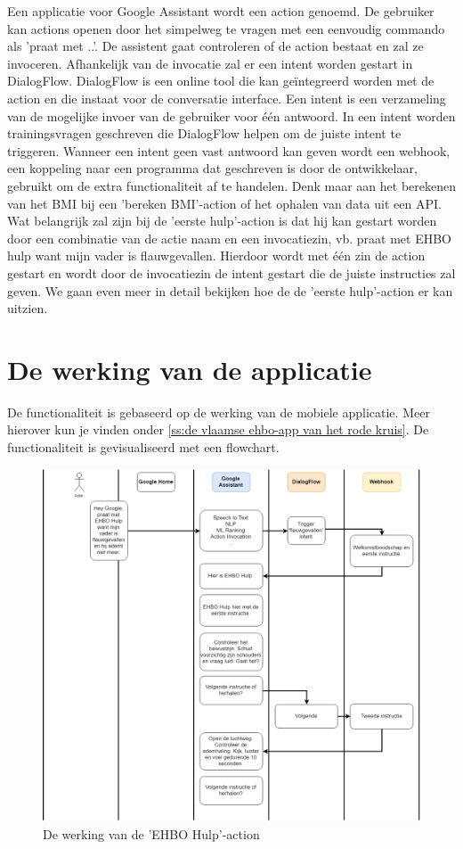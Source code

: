 Een applicatie voor Google Assistant wordt een action genoemd. De gebruiker kan actions openen door het simpelweg te vragen met een eenvoudig commando als 'praat met ..'. De assistent gaat controleren of de action bestaat en zal ze invoceren. Afhankelijk van de invocatie zal er een intent worden gestart in DialogFlow. DialogFlow is een online tool die kan geïntegreerd worden met de action en die instaat voor de conversatie interface. Een intent is een verzameling van de mogelijke invoer van de gebruiker voor één antwoord. In een intent worden trainingsvragen geschreven die DialogFlow helpen om de juiste intent te triggeren. Wanneer een intent geen vast antwoord kan geven wordt een webhook, een koppeling naar een programma dat geschreven is door de ontwikkelaar, gebruikt om de extra functionaliteit af te handelen. Denk maar aan het berekenen van het BMI bij een 'bereken BMI'-action of het ophalen van data uit een API.
Wat belangrijk zal zijn bij de 'eerste hulp'-action is dat hij kan gestart worden door een combinatie van de actie naam en een invocatiezin, vb. praat met EHBO hulp want mijn vader is flauwgevallen. Hierdoor wordt met één zin de action gestart en wordt door de invocatiezin de intent gestart die de juiste instructies zal geven. We gaan even meer in detail bekijken hoe de de 'eerste hulp'-action er kan uitzien.

\section{De werking van de applicatie}
De functionaliteit is gebaseerd op de werking van de mobiele applicatie. Meer hierover kun je vinden onder \ref{ss:de vlaamse ehbo-app van het rode kruis}. De functionaliteit is gevisualiseerd met een flowchart.

\begin{figure}[h]
    \centering
    \includegraphics[width=0.7\linewidth]{img/gaflowehbo}
    \caption{De werking van de 'EHBO Hulp'-action}
    \label{fig:gaflowehbo}
\end{figure}


